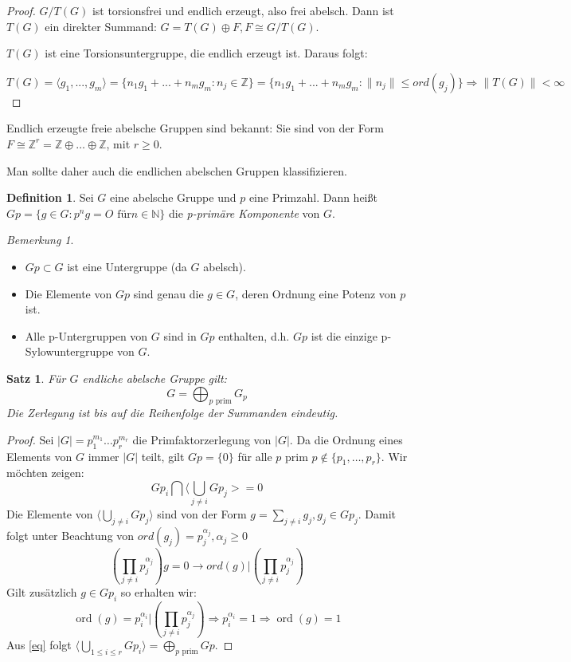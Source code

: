 \documentclass[12pt]{scrartcl} %
\DeclareMathOperator{\ord}{ord}
\newtheorem{thm}{Satz}
\theoremstyle{definition}
\newtheorem*{defn}{Definition}
\theoremstyle{remark}
\newtheorem*{nb}{Bemerkung}
\begin{document}
\begin{proof}
$G/T(G)$ ist torsionsfrei und endlich erzeugt, also frei abelsch. Dann ist $T(G)$ ein direkter Summand: $G = T(G) \oplus F,F\cong G/T(G)$.

$T(G)$ ist eine Torsionsuntergruppe, die endlich erzeugt ist. Daraus folgt: 

$T(G)=\langle g_{1},...,g_{m}\rangle=\{ n_{1}g_{1}+...+n_{m}g_{m}:n_{j}\in \mathbb{Z}\}=\{ n_{1}g_{1}+...+n_{m}g_{m}:\|n_{j}\| \leq ord(g_{j})\} \Rightarrow \|T(G)\| < \infty$
\end{proof}

Endlich erzeugte freie abelsche Gruppen sind bekannt: Sie sind von der Form $F\cong \mathbb{Z}^{r}=\mathbb{Z} \oplus \dots\oplus \mathbb{Z}$, mit $r\geq 0$.

Man sollte daher auch die endlichen abelschen Gruppen klassifizieren.

\begin{defn}
Sei $G$ eine abelsche Gruppe und $p$ eine Primzahl. 
Dann heißt $Gp=\{ g\in G:p^{n}g=O\text{ für} n\in  \mathbb{N} \} $ 
die \emph{p-primäre Komponente} von $G$.
\end{defn}

\begin{nb}
\begin{itemize}
\item $Gp\subset G$ ist eine Untergruppe (da $G$ abelsch).
\item Die Elemente von $Gp$ sind genau die $g\in G$, deren Ordnung eine Potenz von $p$ ist.
\item Alle p-Untergruppen von $G$ sind in $Gp$ enthalten, d.h. $Gp$ ist die einzige p-Sylowuntergruppe von $G$.
\end{itemize}
\end{nb}

\begin{thm}
Für $G$ endliche abelsche Gruppe gilt:
\[ G=\bigoplus_{p \text{ prim}} G_{p} \]
Die Zerlegung ist bis auf die Reihenfolge der Summanden eindeutig.
\end{thm}

\begin{proof}
Sei $| G| =p_{1}^{m_{1}}\dots p_{r}^{m_{r}}$ die Primfaktorzerlegung von $| G|$. 
Da die Ordnung eines Elements von $G$ immer $| G|$ teilt, gilt $Gp=\{ 0\}$ für alle $p$ prim $p\notin \{ p_{1},\dots,p_{r}\}$. Wir möchten zeigen:
\begin{equation} \label{eq}
Gp_{i}\bigcap \langle\bigcup_{j\neq i} Gp_{j}> ={0}
\end{equation}
Die Elemente von $\langle\bigcup_{j\neq i} Gp_{j}\rangle$ sind von der Form $g=\sum_{j\neq i} g_{j}, g_{j} \in Gp_{j}$. Damit folgt unter Beachtung von $ord(g_{j})=p_{j}^{\alpha_{j}}, \alpha_{j}\geq 0$ 
\[(\prod_{j\neq i} p_{j}^{\alpha_{j}})g=0 \rightarrow ord(g)| (\prod_{j\neq i} p_{j}^{\alpha_{j}})\]
Gilt zusätzlich $g \in Gp_{i}$ so erhalten wir:
\[ \ord(g)=p_{i}^{\alpha_{i}}| (\prod_{j\neq i} p_{j}^{\alpha_{j}})\Rightarrow p_{i}^{\alpha_{i}}=1 \Rightarrow \ord(g)=1\]
Aus \eqref{eq} folgt $\langle\bigcup_{1\leq i\leq r} Gp_{i}\rangle = \bigoplus_{p\text{ prim}} Gp$.
\end{proof}
\end{document}
